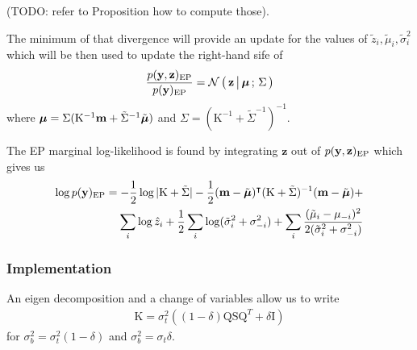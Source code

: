  (TODO: refer to Proposition how to compute those).


The minimum of that divergence will provide an update for the values
of $\tilde z_i, \tilde\mu_i, \tilde\sigma^2_i$ which will be then used to update the right-hand sife of
\begin{align*}
\frac{p(\mathbf y, \mathbf z)_{\text{EP}}}{p(\mathbf y)_{\text{EP}}} = \mathcal{N}\left(\, { {\mathbf z} \, \big| \, {\boldsymbol\mu} } \,;\, { {\Sigma} } \,\right)
\end{align*}
where $\boldsymbol\mu = \Sigma(\mathrm K^{-1} \mathbf m + \tilde\Sigma^{-1}\tilde{\boldsymbol\mu})$ and $\Sigma=(\mathrm K^{-1} + \tilde\Sigma^{-1})^{-1}$.

The EP marginal log-likelihood is found by integrating $\mathbf z$ out of $p(\mathbf y, \mathbf z)_{\text{EP}}$ which gives us
\begin{align*}
\log p(\mathbf y)_{\text{EP}} = -\frac{1}{2} \log |\mathrm K + \tilde \Sigma| - \frac{1}{2} (\mathbf m - \tilde{\boldsymbol\mu})^\intercal(\mathrm K + \tilde\Sigma)^{-1}(\mathbf m - \tilde{\boldsymbol\mu}) +\\
\sum_i \log \hat z_i + \frac{1}{2} \sum_i \log(\tilde \sigma_i^2 + \sigma_{-i}^2) + \sum_i \frac{(\tilde \mu_i - \mu_{-i})^2}{2(\tilde \sigma_i^2 + \sigma_{-i}^2)}
\end{align*}

\subsubsection{Implementation}

An eigen decomposition and a change of variables allow us to write
\begin{align*}
\mathrm K = \sigma_t^2  ((1-\delta)\mathrm Q \mathrm S \mathrm Q^{T} + \delta \mathrm I)
\end{align*}
for $\sigma_b^2=\sigma_t^2(1-\delta)$ and $\sigma_b^2 = \sigma_t \delta$.

